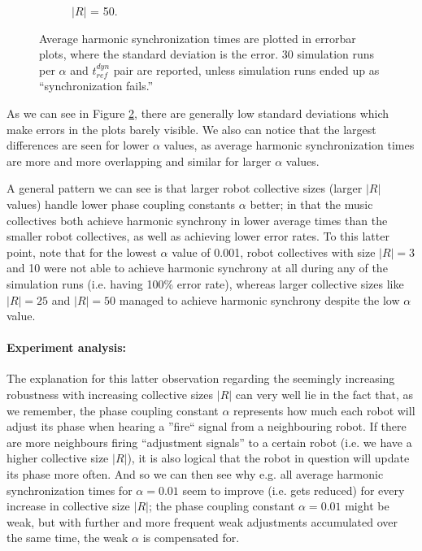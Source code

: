 \begin{figure}[ht!]
\begin{subfigure}[b]{0.5\textwidth}
			\caption{$|R|$ = 50.}
			\label{fig:sub:t_ref_dyn_x_alpha_collsize50}
		  \end{subfigure}
		  \caption[Experiment results for $\phi$ synchronization hyperparameter tuning experiment.]{Average harmonic synchronization times are plotted in errorbar plots, where the standard deviation is the error. 30 simulation runs per $\alpha$ and $t_{ref}^{dyn}$ pair are reported, unless simulation runs ended up as ``synchronization fails.''}
		  \label{fig:phase_sync_hyperparam_tuning_experiment}
		\end{figure}
		
		As we can see in Figure \ref{fig:phase_sync_hyperparam_tuning_experiment}, there are generally low standard deviations which make errors in the plots barely visible. We also can notice that the largest differences are seen for lower $\alpha$ values, as average harmonic synchronization times are more and more overlapping and similar for larger $\alpha$ values.
		
		A general pattern we can see is that larger robot collective sizes (larger $|R|$ values) handle lower phase coupling constants $\alpha$ better; in that the music collectives both achieve harmonic synchrony in lower average times than the smaller robot collectives, as well as achieving lower error rates. To this latter point, note that for the lowest $\alpha$ value of 0.001, robot collectives with size $|R|=3$ and 10 were not able to achieve harmonic synchrony at all during any of the simulation runs (i.e. having 100\% error rate), whereas larger collective sizes like $|R|=25$ and $|R|=50$ managed to achieve harmonic synchrony despite the low $\alpha$ value. 
		
		\paragraph{Experiment analysis:\nl}
		
		The explanation for this latter observation regarding the seemingly increasing robustness with increasing collective sizes $|R|$ can very well lie in the fact that, as we remember, the phase coupling constant $\alpha$ represents how much each robot will adjust its phase when hearing a ''fire`` signal from a neighbouring robot. If there are more neighbours firing ``adjustment signals'' to a certain robot (i.e. we have a higher collective size $|R|$), it is also logical that the robot in question will update its phase more often. And so we can then see why e.g. all average harmonic synchronization times for $\alpha=0.01$ seem to improve (i.e. gets reduced) for every increase in collective size $|R|$; the phase coupling constant $\alpha=0.01$ might be weak, but with further and more frequent weak adjustments accumulated over the same time, the weak $\alpha$ is compensated for.
		
